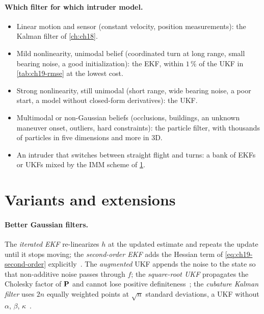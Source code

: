 \paragraph{Which filter for which intruder model.}
\begin{itemize}
  \item Linear motion and sensor (constant velocity, position
  measurements): the Kalman filter of \cref{ch:ch18}.
  \item Mild nonlinearity, unimodal belief (coordinated turn at long range,
  small bearing noise, a good initialization): the EKF, within $1\,\%$ of
  the UKF in \cref{tab:ch19-rmse} at the lowest cost.
  \item Strong nonlinearity, still unimodal (short range, wide bearing
  noise, a poor start, a model without closed-form derivatives): the UKF.
  \item Multimodal or non-Gaussian beliefs (occlusions, buildings, an
  unknown maneuver onset, outliers, hard constraints): the particle
  filter, with thousands of particles in five dimensions and more in 3D.
  \item An intruder that switches between straight flight and turns: a bank
  of EKFs or UKFs mixed by the IMM scheme of \cref{sec:ch19-variants}.
\end{itemize}

\section{Variants and extensions}
\label{sec:ch19-variants}

\paragraph{Better Gaussian filters.}
The \emph{iterated EKF} re-linearizes $h$ at the updated estimate and
repeats the update until it stops moving; the \emph{second-order EKF} adds the
Hessian term of \cref{eq:ch19-second-order}
explicitly~\cite{barshalom2001estimation}. The \emph{augmented} UKF appends
the noise to the state so that non-additive noise passes through $f$; the
\emph{square-root UKF} propagates the Cholesky factor of $\mathbf{P}$ and
cannot lose positive definiteness~\cite{wan2000unscented}; the
\emph{cubature Kalman filter} uses $2n$ equally weighted points at
$\sqrt{n}$ standard deviations, a UKF without $\alpha$, $\beta$,
$\kappa$~\cite{arasaratnam2009cubature}.

